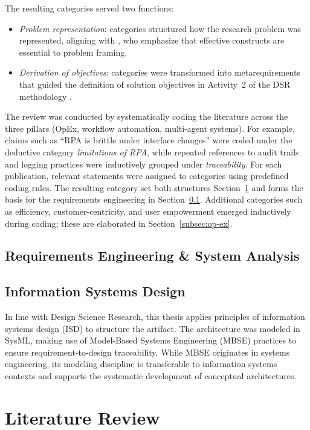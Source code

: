 The resulting categories served two functions:
\begin{itemize}
    \item \textit{Problem representation}: categories structured how the research problem was represented, aligning with \textcite{hevnerDesign2004}, who emphasize that effective constructs are essential to problem framing.
    \item \textit{Derivation of objectives}: categories were transformed into metarequirements that guided the definition of solution objectives in Activity~2 of the DSR methodology \parencite{peffersDesign2007}.
\end{itemize}

The review was conducted by systematically coding the literature across the three pillars (OpEx, workflow automation, multi-agent systems). 
For example, claims such as ``RPA is brittle under interface changes'' were coded under the deductive category \emph{limitations of RPA}, 
while repeated references to audit trails and logging practices were inductively grouped under \emph{traceability}. 
For each publication, relevant statements were assigned to categories using predefined coding rules. 
The resulting category set both structures Section~\ref{sec:lit-rev} and forms the basis for the requirements engineering in Section~\ref{subsec:re-sa}. Additional categories such as efficiency, customer-centricity, and user empowerment emerged inductively during coding; these are elaborated in Section~\ref{subsec:op-ex}.

\subsection{Requirements Engineering \& System Analysis}\label{subsec:re-sa}

\subsection{Information Systems Design}\label{subsec:isd}
In line with Design Science Research, this thesis applies principles of information systems design (ISD) to structure the artifact. The architecture was modeled in SysML, making use of Model-Based Systems Engineering (MBSE) practices to ensure requirement-to-design traceability. While MBSE originates in systems engineering, its modeling discipline is transferable to information systems contexts and supports the systematic development of conceptual architectures.

\section{Literature Review}\label{sec:lit-rev}

